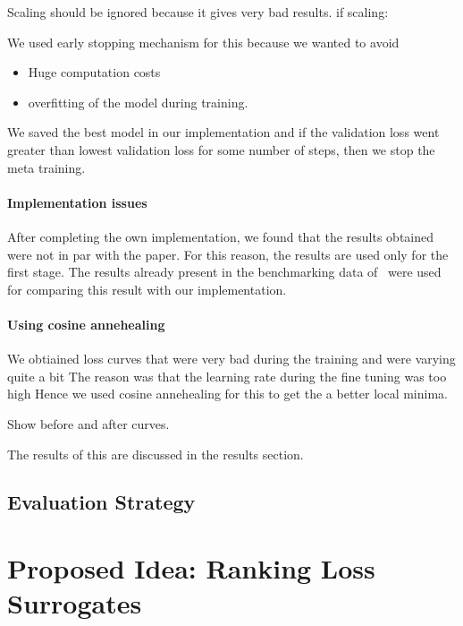 \documentclass[11pt]{report}
\begin{document}
Scaling should be ignored because it gives very bad results.
if scaling:


We used early stopping mechanism for this because we wanted to avoid
\begin{itemize}
\item Huge computation costs
\item overfitting of the model during training.
\end{itemize}
We saved the best model in our implementation and if the validation loss went greater than
lowest validation loss for some number of steps,  then we stop the meta training.



\subsubsection{Implementation issues}
After completing the own implementation,  we found that the results obtained were not in par with the paper.
For this reason, the results are used only for the first stage.
The results already present in the benchmarking data of~\cite{pineda2021hpob} were used for comparing this result with our implementation.

\subsubsection{Using cosine annehealing }
We obtiained loss curves that were very bad during the training and were varying quite a bit
The reason was that the learning rate during the fine tuning was too high
Hence we used cosine annehealing for this to get the a better local minima.

Show before and after curves.


The results of this are discussed in the results section.


\section{Evaluation Strategy}



\chapter{Proposed Idea: Ranking Loss Surrogates}
\end{document}
